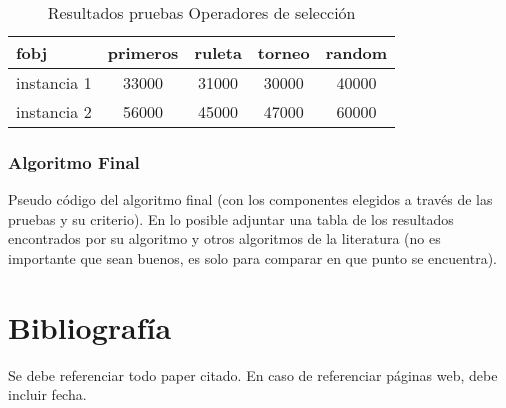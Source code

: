 \documentclass[letter, 10pt]{article}
\begin{document}
\begin{table}
\centering
\begin{tabular}{| l | c | c | c | c |}
\hline
 fobj & primeros & ruleta & torneo & random \\
\hline
 instancia 1 & 33000 &  31000 & 30000 & 40000 \\
\hline
 instancia 2 & 56000 &  45000 & 47000 & 60000 \\
\hline
\end{tabular}
\caption{Resultados pruebas Operadores de selecci\'on}
\end{table}


\subsubsection{Algoritmo Final}
Pseudo c\'odigo del algoritmo final (con los componentes elegidos a trav\'es de las pruebas y su criterio). En lo posible adjuntar una tabla de los resultados encontrados por su algoritmo y otros algoritmos de la literatura (no es importante que sean buenos, es solo para comparar en que punto se encuentra). 

\section{Bibliograf\'ia}
Se debe referenciar todo paper citado. En caso de referenciar p\'aginas web, debe incluir fecha.
\end{document}
